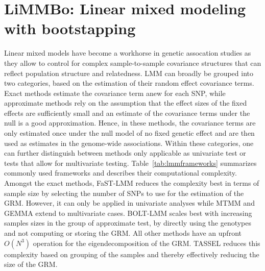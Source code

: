 \section{LiMMBo: Linear mixed modeling with bootstapping}
\label{section:limmbo}
Linear mixed models have become a workhorse in genetic assocation studies as they allow to control for complex sample-to-sample covariance structures that can reflect population structure and relatedness. LMM can broadly be grouped into two categories, based on the estimation of their random effect covariance terms. Exact methods estimate the covariance term anew for each SNP, while approximate methods rely on the assumption that the effect sizes of the fixed effects are sufficiently small \citep{Kang2010,Zhang2010} and an estimate of the covariance terms under the null is a good approximation. Hence, in these methods, the covariance terms are only estimated once under the null model of no fixed genetic effect and are then used as estimates in the genome-wide associations. Within these categories, one can further distinguish between methods only applicable as univariate test or tests that allow for multivariate testing. Table~\ref{tab:lmmframeworks} summarizes commonly used frameworks and describes their computational complexity.  Amongst the exact methods, FaST-LMM reduces the complexity best in terms of sample size by selecting the number of SNPs to use for the estimation of the GRM.  However, it can only be applied in univariate analyses while MTMM and GEMMA extend to multivariate cases.  BOLT-LMM scales best with increasing samples sizes in the group of approximate test, by directly using the genotypes and not computing or storing the GRM. All other methods have an upfront \(O(N^3)\) operation for the eigendecomposition of the GRM. TASSEL reduces this complexity based on grouping of the samples and thereby effectively reducing the size of the GRM.


